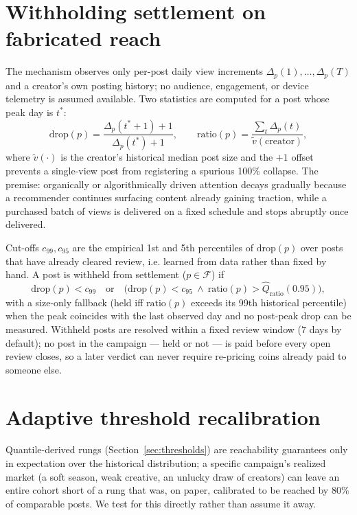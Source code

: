 \documentclass[11pt]{article}
\begin{document}
\section{Withholding settlement on fabricated reach}
\label{sec:fraud}

The mechanism observes only per-post daily view increments $\Delta_p(1), \dots, \Delta_p(T)$ and a
creator's own posting history; no audience, engagement, or device telemetry is assumed available.
Two statistics are computed for a post whose peak day is $t^\ast$:
$$
\text{drop}(p) = \frac{\Delta_p(t^\ast+1) + 1}{\Delta_p(t^\ast) + 1}, \qquad
\text{ratio}(p) = \frac{\sum_t \Delta_p(t)}{\tilde v(\text{creator})},
$$
where $\tilde v(\cdot)$ is the creator's historical median post size and the $+1$ offset prevents a
single-view post from registering a spurious 100\% collapse. The premise: organically or
algorithmically driven attention decays gradually because a recommender continues surfacing
content already gaining traction, while a purchased batch of views is delivered on a fixed schedule
and stops abruptly once delivered.

Cut-offs $c_{99}, c_{95}$ are the empirical 1st and 5th percentiles of $\text{drop}(p)$ over posts
that have already cleared review, i.e. learned from data rather than fixed by hand. A post is
withheld from settlement (\(p \in \mathcal{F}\)) if
$$
\text{drop}(p) < c_{99}
\quad\text{or}\quad
\big(\text{drop}(p) < c_{95} \ \wedge\ \text{ratio}(p) > \hat{Q}_{\text{ratio}}(0.95)\big),
$$
with a size-only fallback (held iff $\text{ratio}(p)$ exceeds its 99th historical percentile) when
the peak coincides with the last observed day and no post-peak drop can be measured. Withheld posts
are resolved within a fixed review window ($7$ days by default); no post in the campaign — held or
not — is paid before every open review closes, so a later verdict can never require re-pricing
coins already paid to someone else.

\section{Adaptive threshold recalibration}
\label{sec:adaptive}

Quantile-derived rungs (Section~\ref{sec:thresholds}) are reachability guarantees only in
expectation over the historical distribution; a specific campaign's realized market (a soft season,
weak creative, an unlucky draw of creators) can leave an entire cohort short of a rung that was, on
paper, calibrated to be reached by 80\% of comparable posts. We test for this directly rather than
assume it away.
\end{document}
